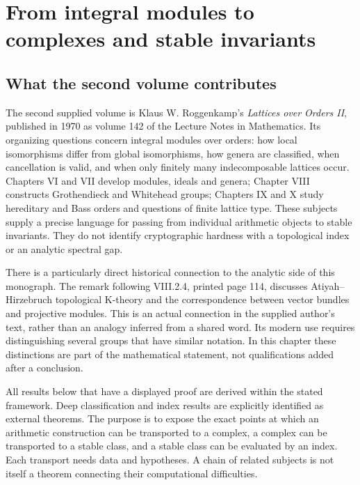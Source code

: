 \chapter{From integral modules to complexes and stable invariants}
\label{ch:orders-complexes}

\section{What the second volume contributes}

The second supplied volume is Klaus W. Roggenkamp's \emph{Lattices over Orders II}, published in 1970 as volume 142 of the Lecture Notes in Mathematics. Its organizing questions concern integral modules over orders: how local isomorphisms differ from global isomorphisms, how genera are classified, when cancellation is valid, and when only finitely many indecomposable lattices occur. Chapters VI and VII develop modules, ideals and genera; Chapter VIII constructs Grothendieck and Whitehead groups; Chapters IX and X study hereditary and Bass orders and questions of finite lattice type. These subjects supply a precise language for passing from individual arithmetic objects to stable invariants. They do not identify cryptographic hardness with a topological index or an analytic spectral gap.\cite{v2Roggenkamp1970II}

There is a particularly direct historical connection to the analytic side of this monograph. The remark following VIII.2.4, printed page 114, discusses Atiyah--Hirzebruch topological K-theory and the correspondence between vector bundles and projective modules. This is an actual connection in the supplied author's text, rather than an analogy inferred from a shared word. Its modern use requires distinguishing several groups that have similar notation. In this chapter these distinctions are part of the mathematical statement, not qualifications added after a conclusion.\cite[Chapter VIII, \S\S1--2]{v2Roggenkamp1970II}

All results below that have a displayed proof are derived within the stated framework. Deep classification and index results are explicitly identified as external theorems. The purpose is to expose the exact points at which an arithmetic construction can be transported to a complex, a complex can be transported to a stable class, and a stable class can be evaluated by an index. Each transport needs data and hypotheses. A chain of related subjects is not itself a theorem connecting their computational difficulties.

